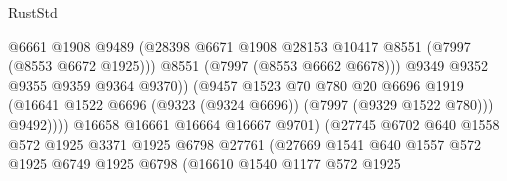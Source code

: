 \begin{lexlean}{RustStd}
\begin{coremodule}
                                          @6661
                                          @1908
                                          @9489
                                          (@28398
                                            @6671
                                            @1908
                                            @28153
                                            @10417
                                            @8551
                                            (@7997 (@8553 @6672 @1925)))
                                          @8551
                                          (@7997 (@8553 @6662 @6678)))
                                        @9349
                                        @9352
                                        @9355
                                        @9359
                                        @9364
                                        @9370))
                                    (@9457
                                      @1523
                                      @70
                                      @780
                                      @20
                                      @6696
                                      @1919
                                      (@16641
                                        @1522
                                        @6696
                                        (@9323 (@9324 @6696))
                                        (@7997 (@9329 @1522 @780)))
                                      @9492))))
                              @16658
                              @16661
                              @16664
                              @16667
                              @9701)
                            (@27745
                              @6702
                              @640
                              @1558
                              @572
                              @1925
                              @3371
                              @1925
                              @6798
                              @27761
                              (@27669
                                @1541
                                @640
                                @1557
                                @572
                                @1925
                                @6749
                                @1925
                                @6798
                                (@16610
                                  @1540
                                  @1177
                                  @572
                                  @1925

\end{coremodule}
\end{lexlean}
